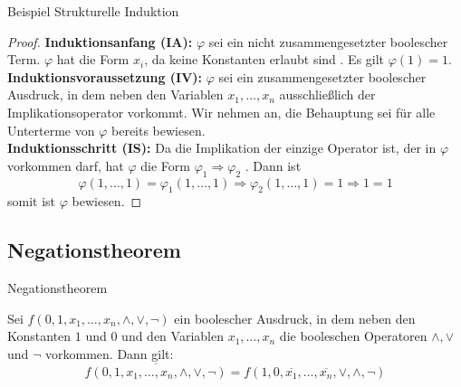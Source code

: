 \documentclass[12pt%
,aspectratio=169%
]{beamer}
\begin{document}
\begin{frame}{Beispiel Strukturelle Induktion}

\begin{proof}
\textbf{Induktionsanfang (IA):} $\varphi$ sei ein nicht zusammengesetzter boolescher Term. $\varphi$ hat die Form $x_i$, da keine Konstanten erlaubt sind . Es gilt $\varphi(1) = 1$.\\
\textbf{Induktionsvoraussetzung (IV):} $\varphi$ sei ein zusammengesetzter boolescher Ausdruck, in dem neben den Variablen $x_1, \ldots, x_n$ ausschließlich der Implikationsoperator vorkommt. Wir nehmen an, die Behauptung sei für alle Unterterme von $\varphi$ bereits bewiesen.\\
\textbf{Induktionsschritt (IS):} Da die Implikation der einzige Operator ist, der in $\varphi$ vorkommen darf, hat $\varphi$ die Form $\varphi_1 \Rightarrow \varphi_2$ . Dann ist
$$
\varphi(1,\ldots, 1) = \varphi_1(1, \ldots , 1) \Rightarrow \varphi_2(1, \ldots, 1) = 1 \Rightarrow 1 = 1
$$
somit ist $\varphi$ bewiesen.
\end{proof}
\end{frame}

\subsection{Negationstheorem}
\begin{frame}{Negationstheorem}
\begin{theorem}
Sei $f(0, 1, x_1 , \ldots , x_n , \land, \lor, \neg)$ ein boolescher Ausdruck, in dem neben den Konstanten $1$ und $0$ und den Variablen $x_1 ,\ldots, x_n$ die booleschen Operatoren $\land, \lor$ und $\neg$ vorkommen. Dann gilt:
$$
	\overline{f(0, 1, x_1 , \ldots , x_n , \land, \lor, \neg)} = f(1, 0, \overline{x_1}, \ldots ,\overline{x_n} ,\lor, \land, \neg)
$$
\end{theorem}
\end{frame}
\end{document}
